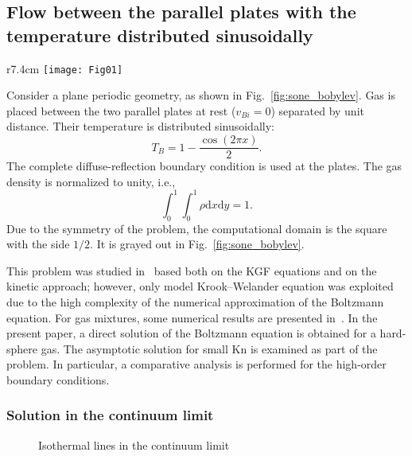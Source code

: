 \documentclass[10pt]{article}
\newcommand{\Kn}{\mathrm{Kn}}
\newcommand{\dd}{\mathrm{d}}
\begin{document}
\subsection{Flow between the parallel plates with the temperature distributed sinusoidally}

\begin{wrapfigure}{r}{7.4cm}
    \vspace{-20pt}
    \centering
    \texttt{[image: Fig01]}
    \vspace{-10pt}
    \caption{Geometry of the problem}\label{fig:sone_bobylev}
\end{wrapfigure}

Consider a plane periodic geometry, as shown in Fig.~\ref{fig:sone_bobylev}.
Gas is placed between the two parallel plates at rest (\(v_{Bi} = 0\)) separated by unit distance.
Their temperature is distributed sinusoidally:
\begin{equation}
    T_B = 1 - \frac{\cos(2\pi x)}{2}.
\end{equation}
The complete diffuse-reflection boundary condition is used at the plates.
The gas density is normalized to unity, i.e.,
\begin{equation}\label{eq:total_mass}
    \int_0^1\int_0^1\rho\dd{x}\dd{y} = 1.
\end{equation}
Due to the symmetry of the problem, the computational domain is the square with the side \(1/2\).
It is grayed out in Fig.~\ref{fig:sone_bobylev}.

This problem was studied in~\cite{Sone1996} based both on the KGF equations and on the kinetic approach;
however, only model Krook--Welander equation was exploited due to the high complexity
of the numerical approximation of the Boltzmann equation.
For gas mixtures, some numerical results are presented in~\cite{Wu2015}.
In the present paper, a direct solution of the Boltzmann equation is obtained for a hard-sphere gas.
The asymptotic solution for small \(\Kn\) is examined as part of the problem.
In particular, a comparative analysis is performed for the high-order boundary conditions.

\subsubsection{Solution in the continuum limit}

\begin{figure}
    \centering
    \caption{Isothermal lines in the continuum limit}
    \label{fig:continuum:temp}
\end{figure}
\end{document}
